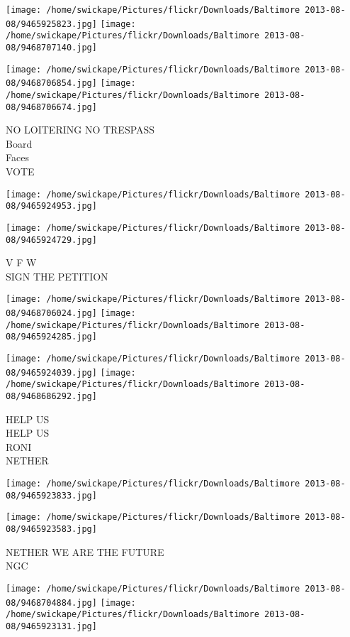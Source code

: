 \documentclass[10pt,letterpaper]{article}
\begin{document}
\texttt{[image: /home/swickape/Pictures/flickr/Downloads/Baltimore 2013-08-08/9465925823.jpg]}
\texttt{[image: /home/swickape/Pictures/flickr/Downloads/Baltimore 2013-08-08/9468707140.jpg]}

\texttt{[image: /home/swickape/Pictures/flickr/Downloads/Baltimore 2013-08-08/9468706854.jpg]}
\texttt{[image: /home/swickape/Pictures/flickr/Downloads/Baltimore 2013-08-08/9468706674.jpg]}

NO LOITERING NO TRESPASS\\
Board\\
Faces\\
VOTE
\pagebreak

\texttt{[image: /home/swickape/Pictures/flickr/Downloads/Baltimore 2013-08-08/9465924953.jpg]}

\vspace{0.25in}
\texttt{[image: /home/swickape/Pictures/flickr/Downloads/Baltimore 2013-08-08/9465924729.jpg]}

V F W\\
SIGN THE PETITION
\pagebreak

\texttt{[image: /home/swickape/Pictures/flickr/Downloads/Baltimore 2013-08-08/9468706024.jpg]}
\texttt{[image: /home/swickape/Pictures/flickr/Downloads/Baltimore 2013-08-08/9465924285.jpg]}

\texttt{[image: /home/swickape/Pictures/flickr/Downloads/Baltimore 2013-08-08/9465924039.jpg]}
\texttt{[image: /home/swickape/Pictures/flickr/Downloads/Baltimore 2013-08-08/9468686292.jpg]}

HELP US\\
HELP US\\
RONI\\
NETHER
\pagebreak

\texttt{[image: /home/swickape/Pictures/flickr/Downloads/Baltimore 2013-08-08/9465923833.jpg]}

\vspace{0.25in}
\texttt{[image: /home/swickape/Pictures/flickr/Downloads/Baltimore 2013-08-08/9465923583.jpg]}

NETHER WE ARE THE FUTURE\\
NGC
\pagebreak

\texttt{[image: /home/swickape/Pictures/flickr/Downloads/Baltimore 2013-08-08/9468704884.jpg]}
\texttt{[image: /home/swickape/Pictures/flickr/Downloads/Baltimore 2013-08-08/9465923131.jpg]}
\end{document}
